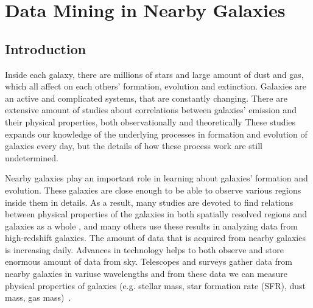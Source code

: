 \chapter{Data Mining in Nearby Galaxies}
\section{Introduction} %
Inside each galaxy, there are millions of stars and large amount of dust and gas, which all affect on each others' formation, evolution and extinction.
Galaxies are an active and complicated systems, that are constantly changing.
There are extensive amount of studies about correlations between galaxies' emission and their physical properties, both observationally and theoretically %
These studies expands our knowledge of the underlying processes in formation and evolution of galaxies every day, but the details of how these process work are still undetermined.

Nearby galaxies play an important role in learning about galaxies' formation and evolution.
These galaxies are close enough to be able to observe various regions inside them in details.
As a result, many studies are devoted to find relations between physical properties of the galaxies in both spatially resolved regions and galaxies as a whole%
, and many others use these results in analyzing data from high-redshift galaxies. %
The amount of data that is acquired from nearby galaxies is increasing daily.
Advances in technology helps to both observe and store enormous amount of data from sky.%
Telescopes and surveys gather data from nearby galaxies in variuse wavelengths and from these data we can measure physical properties of galaxies (e.g. stellar mass, star formation rate (SFR), dust mass, gas mass)~\citep[e.g.][]{Calzetti07,Dale09,Eskew12}.

